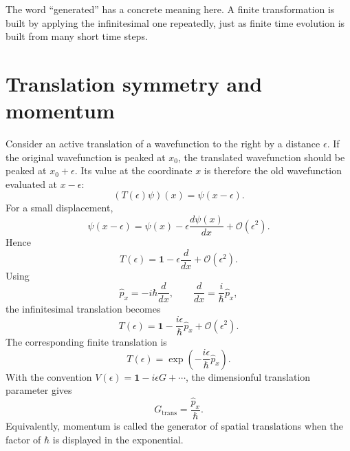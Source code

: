 The word ``generated'' has a concrete meaning here. A finite transformation is built by applying the infinitesimal one repeatedly, just as finite time evolution is built from many short time steps.

\section{Translation symmetry and momentum}

Consider an active translation of a wavefunction to the right by a distance \(\epsilon\). If the original wavefunction is peaked at \(x_0\), the translated wavefunction should be peaked at \(x_0+\epsilon\). Its value at the coordinate \(x\) is therefore the old wavefunction evaluated at \(x-\epsilon\):
\begin{equation}
(T(\epsilon)\psi)(x)=\psi(x-\epsilon).
\end{equation}
For a small displacement,
\begin{equation}
\psi(x-\epsilon)
=
\psi(x)-\epsilon\frac{d\psi(x)}{dx}
+\mathcal O(\epsilon^2).
\end{equation}
Hence
\begin{equation}
T(\epsilon)
=
\mathbf 1-\epsilon\frac{d}{dx}
+\mathcal O(\epsilon^2).
\end{equation}
Using
\begin{equation}
\hat p_x=-i\hbar\frac{d}{dx},
\qquad
\frac{d}{dx}=\frac{i}{\hbar}\hat p_x,
\end{equation}
the infinitesimal translation becomes
\begin{equation}
T(\epsilon)
=
\mathbf 1-\frac{i\epsilon}{\hbar}\hat p_x
+\mathcal O(\epsilon^2).
\end{equation}
The corresponding finite translation is
\begin{equation}
T(\epsilon)
=
\exp\left(-\frac{i\epsilon}{\hbar}\hat p_x\right).
\end{equation}
With the convention \(V(\epsilon)=\mathbf 1-i\epsilon G+\cdots\), the dimensionful translation parameter gives
\begin{equation}
G_{\mathrm{trans}}=\frac{\hat p_x}{\hbar}.
\end{equation}
Equivalently, momentum is called the generator of spatial translations when the factor of \(\hbar\) is displayed in the exponential.

\begin{classroomqa}
\end{classroomqa}


